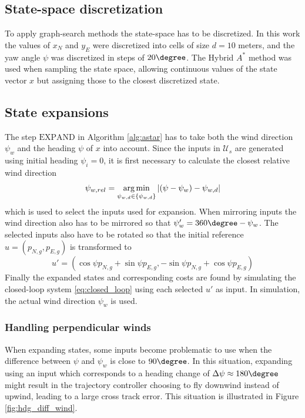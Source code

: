 \subsection{State-space discretization}
To apply graph-search methods the state-space has to be discretized. In this work the values of $x_N$ and $y_E$ were discretized into cells of size $d=10$ meters, and the 
yaw angle $\psi$ was discretized in steps of $20\degree$. The Hybrid $A^*$ method was used when sampling the state space, allowing continuous values of the state vector $x$ but assigning those to the closest 
discretized state.

\subsection{State expansions}
The step $\text{EXPAND}$ in Algorithm \ref{alg:astar} has to take both the wind direction $\psi_w$ and the heading $\psi$ of $x$ into account. 
Since the inputs in $\mathcal{U}_s$ are generated using initial heading $\psi_i=0$, it is first necessary to calculate the closest relative wind direction
\begin{equation}
    \psi_{w,rel}=\operatorname*{arg\,min}_{\psi_{w,d}\in\{\psi_{w,d}\}}|(\psi-\psi_w)-\psi_{w,d}|
\end{equation}
which is used to select the inputs used for expansion. When mirroring inputs the wind direction also has to be mirrored so that 
$\psi_w'=360\degree-\psi_w$. The selected inputs also have to be rotated so that the initial reference $u=(p_{N,g},p_{E,g})$ is transformed to 
\begin{equation}
    u'=(\cos\psi p_{N,g} + \sin\psi p_{E,g}, -\sin\psi p_{N,g} + \cos\psi p_{E,g})
\end{equation}
Finally the expanded states and corresponding costs are found by simulating the closed-loop system \eqref{eq:closed_loop} using each selected $u'$ as input. 
In simulation, the actual wind direction $\psi_w$ is used.
\subsubsection{Handling perpendicular winds}
When expanding states, some inputs become problematic to use when the difference between 
$\psi$ and $\psi_w$ is close to $90 \degree$. In this situation, expanding using an input which corresponds to a heading change 
 of $\Delta\psi\approx180\degree$ might result in the trajectory controller choosing to fly downwind instead of upwind, leading to a large cross track error. This situation is 
 illustrated in Figure \ref{fig:hdg_diff_wind}.

